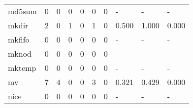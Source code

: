 \begin{longtable}{lp{2.0cm}p{2.0cm}p{2.0cm}p{2.0cm}p{2.0cm}p{2.0cm}p{2.0cm}p{2.0cm}p{2.0cm}}
md5sum    &                      0 &                                  0 &                                 0 &                                0 &                                 0 &                               0 &                                    - &                                      - &                                    - \\
mkdir     &                      2 &                                  0 &                                 1 &                                0 &                                 1 &                               0 &                                0.500 &                                  1.000 &                                0.000 \\
mkfifo    &                      0 &                                  0 &                                 0 &                                0 &                                 0 &                               0 &                                    - &                                      - &                                    - \\
mknod     &                      0 &                                  0 &                                 0 &                                0 &                                 0 &                               0 &                                    - &                                      - &                                    - \\
mktemp    &                      0 &                                  0 &                                 0 &                                0 &                                 0 &                               0 &                                    - &                                      - &                                    - \\
mv        &                      7 &                                  4 &                                 0 &                                0 &                                 3 &                               0 &                                0.321 &                                  0.429 &                                0.000 \\
nice      &                      0 &                                  0 &                                 0 &                                0 &                                 0 &                               0 &                                    - &                                      - &                                    - \\

\end{longtable}
